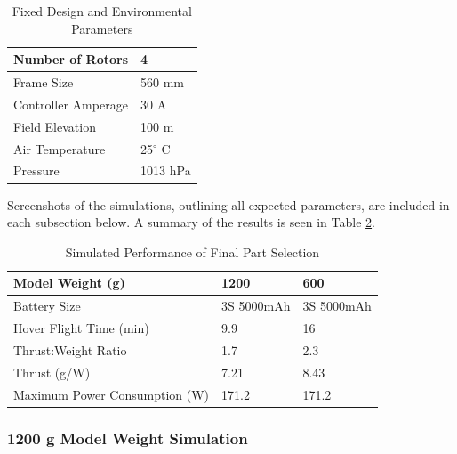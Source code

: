 \begin{table}[H]
\centering
\begin{tabular}{|l|l|}
\hline
Number of Rotors    & 4        \\ \hline
Frame Size          & 560 mm   \\ \hline
Controller Amperage & 30 A     \\ \hline
Field Elevation     & 100 m    \\ \hline
Air Temperature     & 25$^{\circ}$ C     \\ \hline
Pressure            & 1013 hPa \\ \hline
\end{tabular}
\caption{Fixed Design and Environmental Parameters}
\label{env_param}
\end{table}

Screenshots of the simulations, outlining all expected parameters, are included in each subsection below. A summary of the results is seen in Table \ref{summary}.

\begin{table}[H]
\centering
\begin{tabular}{|l|l|l|}
\hline
\textbf{Model Weight (g)}              & \textbf{1200}       & \textbf{600}        \\ \hline
Battery Size                  & 3S 5000mAh & 3S 5000mAh \\ \hline
Hover Flight Time (min)       & 9.9        & 16         \\ \hline
Thrust:Weight Ratio           & 1.7        & 2.3        \\ \hline
Thrust (g/W)                  & 7.21       & 8.43       \\ \hline
Maximum Power Consumption (W) & 171.2      & 171.2      \\ \hline
\end{tabular}
\caption{Simulated Performance of Final Part Selection}
\label{summary}
\end{table}

\subsubsection{1200 g Model Weight Simulation}

